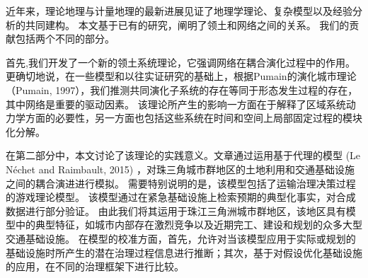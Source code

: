 近年来，理论地理与计量地理的最新进展见证了地理学理论、复杂模型以及经验分析的共同建构。
本文基于已有的研究，阐明了领土和网络之间的关系。
我们的贡献包括两个不同的部分。

首先,我们开发了一个新的领土系统理论，它强调网络在耦合演化过程中的作用。
更确切地说，在一些模型和以往实证研究的基础上，根据Pumain的演化城市理论（Pumain, 1997），我们推测共同演化子系统的存在等同于形态发生过程的存在，其中网络是重要的驱动因素。
该理论所产生的影响一方面在于解释了区域系统动力学方面的必要性，另一方面也包括这些系统在时间和空间上局部固定过程的模块化分解。

在第二部分中，本文讨论了该理论的实践意义。文章通过运用基于代理的模型 (Le Néchet and Raimbault, 2015) ，对珠三角城市群地区的土地利用和交通基础设施之间的耦合演进进行模拟。
需要特别说明的是，该模型包括了运输治理决策过程的游戏理论模型。
该模型通过在紧急基础设施上检索预期的典型化事实，对合成数据进行部分验证。
由此我们将其运用于珠江三角洲城市群地区，该地区具有模型中的典型特征，如城市内部存在激烈竞争以及近期完工、建设和规划的众多大型交通基础设施。
在模型的校准方面，首先，允许对当该模型应用于实际或规划的基础设施时所产生的潜在治理过程信息进行推断；其次，基于对假设优化基础设施的应用，在不同的治理框架下进行比较。




\bigskip
\bigskip











